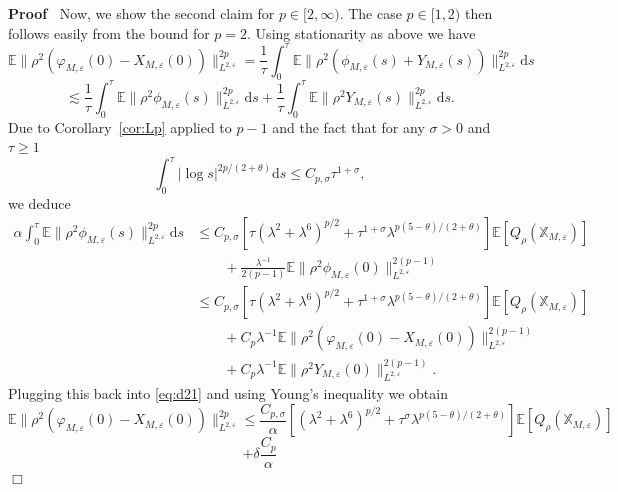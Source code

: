 \documentclass[a4paper,11pt]{article}
\newcommand{\mathd}{\mathrm{d}}
\newenvironment{proof}{\noindent\textbf{Proof\ }}{\hspace*{\fill}$\Box$\medskip}
\numberwithin{equation}{section}
\begin{document}
\begin{proof}
  Now, we show the second claim for $p \in [2, \infty)$. The case $p \in [1,
  2)$ then follows easily from the bound for $p=2$. Using stationarity as above we have
  \[ \mathbb{E} \| \rho^2 (\varphi_{M, \varepsilon} (0) - X_{M, \varepsilon}
     (0)) \|_{L^{2, \varepsilon}}^{2 p} = \frac{1}{\tau} \int_0^{\tau}
     \mathbb{E} \| \rho^2 (\phi_{M, \varepsilon} (s) + Y_{M, \varepsilon} (s))
     \|_{L^{2, \varepsilon}}^{2 p} \mathd s \]
  \[ \  \]
  \begin{equation}
    \lesssim \frac{1}{\tau} \int_0^{\tau} \mathbb{E} \| \rho^2 \phi_{M,
    \varepsilon} (s) \|_{L^{2, \varepsilon}}^{2 p} \mathd s + \frac{1}{\tau}
    \int_0^{\tau} \mathbb{E} \| \rho^2 Y_{M, \varepsilon} (s) \|_{L^{2,
    \varepsilon}}^{2 p} \mathd s. \label{eq:d21}
  \end{equation}
  Due to Corollary~\ref{cor:Lp} applied to $p - 1$ and the fact that for any $\sigma>0$ and  $\tau\geqslant 1$
  $$\int_{0}^{\tau}| \log s|^{2p/(2+\theta)}\mathrm{d} s\leqslant C_{p,\sigma}\tau^{1+\sigma},$$
  we deduce
  \[ \begin{aligned}
  \alpha \int_0^{\tau} \mathbb{E} \| \rho^2 \phi_{M, \varepsilon} (s)
     \|_{L^{2, \varepsilon}}^{2 p} \mathd s & \leqslant C_{p,\sigma} [\tau(\lambda^{2} + \lambda^{6})^{p/2}+\tau^{1+\sigma}\lambda^{p(5-\theta)/(2+\theta)}] \mathbb{E}
     [Q_{\rho} (\mathbb{X}_{M,\varepsilon})] \\
     &\qquad + \frac{\lambda^{-1}}{2 (p - 1)}
     \mathbb{E} \| \rho^2 \phi_{M, \varepsilon} (0) \|_{L^{2, \varepsilon}}^{2
     (p - 1)} \\
  & \leqslant C_{p,\sigma}[\tau(\lambda^{2} + \lambda^{6})^{p/2}+\tau^{1+\sigma}\lambda^{p(5-\theta)/(2+\theta)}]  \mathbb{E} [Q_{\rho} (\mathbb{X}_{M,\varepsilon})] 
     \\ & \qquad + C_p  \lambda^{-1}\mathbb{E} \| \rho^2 (\varphi_{M, \varepsilon} (0) - X_{M,
     \varepsilon} (0)) \|_{L^{2, \varepsilon}}^{2 (p - 1)} 
     \\ & \qquad + C_p \lambda^{-1}\mathbb{E} \|
     \rho^2 Y_{M, \varepsilon} (0) \|_{L^{2, \varepsilon}}^{2 (p - 1)} . \end{aligned}\]
  Plugging this back into {\eqref{eq:d21}} and using Young's inequality we
  obtain
  \[ \mathbb{E} \| \rho^2 (\varphi_{M, \varepsilon} (0) - X_{M, \varepsilon}
     (0)) \|_{L^{2, \varepsilon}}^{2 p} \leqslant \frac{C_{p,\sigma}}{\alpha}[(\lambda^{2} + \lambda^{6})^{p/2}+\tau^{\sigma}\lambda^{p(5-\theta)/(2+\theta)}] \mathbb{E}
     [Q_{\rho} (\mathbb{X}_{M,\varepsilon})]  \]
  \[ + \delta \frac{C_p}{\alpha
}\]
\end{proof}
\end{document}
